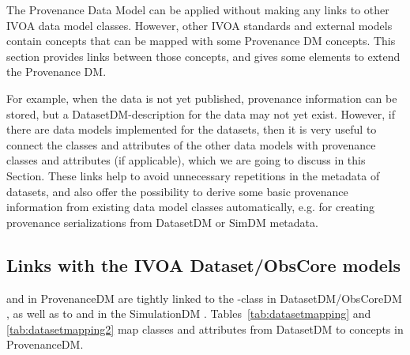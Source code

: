 
The Provenance Data Model can be applied without making any links to other 
IVOA data model classes. 
However, other IVOA standards and external models contain concepts that can be mapped with some Provenance DM concepts. This section provides links between those concepts, and gives some elements to extend the Provenance DM.

For example, when the data is not yet published, provenance information
can be stored, but a DatasetDM-description for the data may not yet exist.
However, if there are data models implemented for the datasets, then it is 
very useful to connect the classes and attributes of the other data models with provenance classes and attributes (if applicable), which we are going to discuss in this Section. These links help to avoid 
unnecessary repetitions in the metadata of datasets, and also offer the possibility 
to derive some basic provenance information from existing data model classes automatically, e.g. for creating provenance serializations from DatasetDM or SimDM metadata.



\subsection{Links with the IVOA Dataset/ObsCore models}
\label{sec:dataset-obscore}

 and  in ProvenanceDM 
are tightly linked to the -class in DatasetDM/ObsCoreDM \citep{std:DatasetDM, std:OBSCORE}, as well as to 
 and  in the SimulationDM \citep{std:SimDM}.
Tables~\ref{tab:datasetmapping} and \ref{tab:datasetmapping2} map classes and attributes from DatasetDM
to concepts in ProvenanceDM. 




